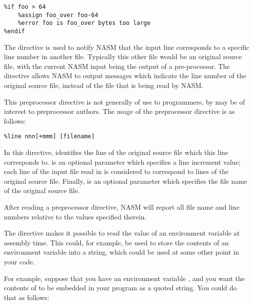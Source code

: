 \begin{lstlisting}
%if foo > 64
    %assign foo_over foo-64
    %error foo is foo_over bytes too large
%endif
\end{lstlisting}



The  directive is used to notify NASM that the input line
corresponds to a specific line number in another file. Typically
this other file would be an original source file, with the current
NASM input being the output of a pre-processor. The 
directive allows NASM to output messages which indicate the line
number of the original source file, instead of the file that is being
read by NASM.

This preprocessor directive is not generally of use to programmers,
by may be of interest to preprocessor authors. The usage of the
 preprocessor directive is as follows:

\begin{lstlisting}
%line nnn[+mmm] [filename]
\end{lstlisting}

In this directive,  identifies the line of the original source
file which this line corresponds to.  is an optional parameter
which specifies a line increment value; each line of the input file
read in is considered to correspond to  lines of the original
source file. Finally,  is an optional parameter which
specifies the file name of the original source file.

After reading a  preprocessor directive, NASM will report
all file name and line numbers relative to the values specified
therein.


The  directive makes it possible to read the
value of an environment variable at assembly time. This could, for example,
be used to store the contents of an environment variable into a string, which
could be used at some other point in your code.

For example, suppose that you have an environment variable ,
and you want the contents of  to be embedded in your program as
a quoted string. You could do that as follows:

